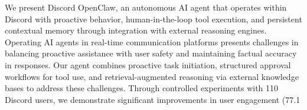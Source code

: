 We present Discord OpenClaw, an autonomous AI agent that operates within Discord with proactive behavior, human-in-the-loop tool execution, and persistent contextual memory through integration with external reasoning engines. Operating AI agents in real-time communication platforms presents challenges in balancing proactive assistance with user safety and maintaining factual accuracy in responses. Our agent combines proactive task initiation, structured approval workflows for tool use, and retrieval-augmented reasoning via external knowledge bases to address these challenges. Through controlled experiments with 110 Discord users, we demonstrate significant improvements in user engagement (77.1%